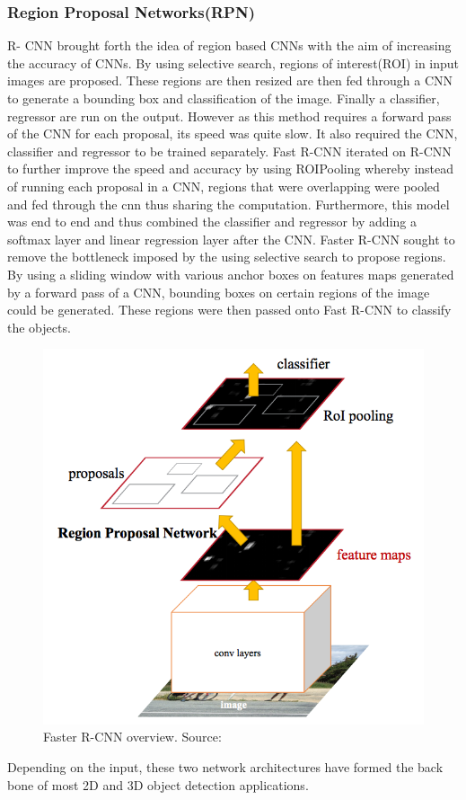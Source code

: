 \subsubsection*{Region Proposal Networks(RPN)}
R- CNN\cite{} brought forth the idea of region based CNNs with the aim of increasing the accuracy of CNNs. By using selective search, regions of interest(ROI) in input images are proposed. These regions are then resized are then fed through a CNN to generate a bounding box and classification of the image. Finally a classifier, regressor are run on the output. However as this method requires a forward pass of the CNN for each proposal, its speed was quite slow. It also required the CNN, classifier and regressor to be trained separately. 
Fast R-CNN\cite{girshickICCV15fastrcnn} iterated on R-CNN to further improve the speed and accuracy by using ROIPooling whereby instead of running each proposal in a CNN, regions that were overlapping were pooled and fed through the cnn thus sharing the computation. Furthermore, this model was end to end and thus combined the  classifier and regressor  by adding a softmax layer and linear regression layer after the CNN.
Faster R-CNN\cite{ren2015faster} sought to remove the bottleneck imposed by the using selective search to propose regions. By using a sliding window with various anchor boxes on features maps generated by a forward pass of a CNN, bounding boxes on certain regions of the image could be generated. These regions were then passed onto Fast R-CNN to classify the objects. 
\begin{figure}[h]
	\centering
	\includegraphics[width=0.5\linewidth]{images/fastercnn}
	\caption{Faster R-CNN overview. Source:\cite{ren2015faster}}
\end{figure}


Depending on the input, these two network architectures have formed the back bone of most 2D and 3D object detection applications. 
